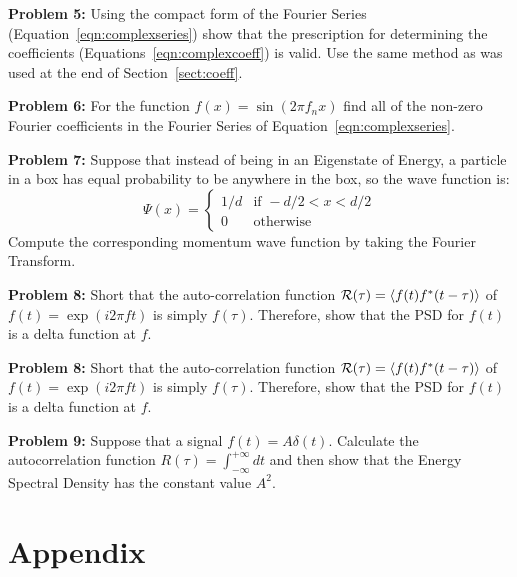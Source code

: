 \documentclass[12pt]{article}
\begin{document}
\noindent
{\bf Problem 5:} Using the compact form of the Fourier Series (Equation~\ref{eqn:complexseries}) show that the prescription for determining the coefficients (Equations~\ref{eqn:complexcoeff}) is valid.  Use the same method as was used at the end of Section~\ref{sect:coeff}. \\
\vskip 0.5cm


\noindent
{\bf Problem 6:} For the function $f(x) = \sin(2 \pi f_n x )$ find all of the non-zero Fourier coefficients in the Fourier Series of Equation~\ref{eqn:complexseries}.\\
\vskip 0.5cm

\noindent
{\bf Problem 7:}  Suppose that instead of being in an Eigenstate of Energy, a particle in a box has equal probability to be anywhere in the box, so the wave function is:
\begin{displaymath}
\Psi(x) = 
\left\{
	\begin{array}{ll}
		1/d  & \mbox{if } -d/2 < x < d/2 \\
		0 & \mbox{otherwise}
	\end{array}
\right.
\end{displaymath}
Compute the corresponding momentum wave function by taking the Fourier Transform.


\noindent
{\bf Problem 8:}  Short that the auto-correlation function $\mathcal{R}(\tau) = \braket{f(t)f^*(t-\tau)}$ of $f(t)=\exp(i2\pi f t)$ is simply $f(\tau)$.  Therefore, show that the PSD for $f(t)$ is a delta function at $f$.

\noindent
{\bf Problem 8:}  Short that the auto-correlation function $\mathcal{R}(\tau) = \braket{f(t)f^*(t-\tau)}$ of $f(t)=\exp(i2\pi f t)$ is simply $f(\tau)$.  Therefore, show that the PSD for $f(t)$ is a delta function at $f$.

\noindent
{\bf Problem 9:}  Suppose that a signal $f(t) = A \delta(t)$.  Calculate the autocorrelation function $R(\tau)=\int_{-\infty}^{+\infty} dt$ and then show that the Energy Spectral Density has the constant value $A^2$.

\section{Appendix}

\end{document}
